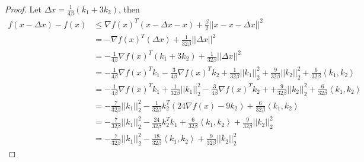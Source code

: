 \documentclass[12pt,twoside]{article}
\begin{document}
\begin{proof}
Let $\Delta x =  \frac{1}{4\beta}(k_1 + 3k_2)$, then
\begin{equation}
\begin{aligned}\label{ineq0}
f(x - \Delta x) - f(x) &\leq \nabla f(x)^T (x - \Delta x - x) + \frac{\beta}{2} || x - x - \Delta x ||^2 \\
&= -  \nabla f(x)^T ( \Delta x) + \frac{1}{32 \beta} || \Delta x ||^2 \\
&= -\frac{1}{4 \beta} \nabla  f(x)^T ( k_1 + 3k_2) + \frac{1}{32 \beta} || \Delta x ||^2 \\
&= -\frac{1}{4\beta}\nabla f(x)^T k_1 - \frac{3}{4\beta}\nabla f(x)^T k_2 + \frac{1}{32 \beta} || k_1 ||_2^2 + \frac{9}{32 \beta} || k_2 ||^2_2 + \frac{6}{32\beta}\left\langle k_1, k_2 \right\rangle \\
&= -\frac{1}{4\beta}\nabla f(x)^T k_1 +  \frac{1}{32 \beta} || k_1 ||_2^2 -  \frac{3}{4\beta}\nabla f(x)^T k_2 +  + \frac{9}{32 \beta} || k_2 ||^2_2  + \frac{6}{32\beta}\left\langle k_1, k_2 \right\rangle \\
&= -\frac{7}{32 \beta}|| k_1 ||_2^2 -\frac{1}{32 \beta}k_2^T(24 \nabla f(x) - 9 k_2) + \frac{6}{32\beta}\left\langle k_1, k_2 \right\rangle \\
&= -\frac{7}{32 \beta}|| k_1 ||_2^2 - \frac{24}{32 \beta}k_2^Tk_1 + \frac{6}{32 \beta}\left\langle k_1, k_2 \right\rangle + \frac{9}{32\beta}|| k_2 ||_2^2 \\
&= -\frac{7}{32 \beta}|| k_1 ||_2^2 - \frac{18}{32 \beta} \left\langle k_1, k_2 \right\rangle + \frac{9}{32 \beta}|| k_2 ||_2^2
\end{aligned}
\end{equation}


\end{proof}
\end{document}
